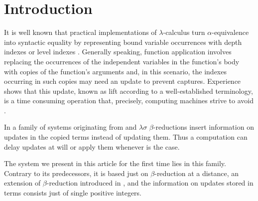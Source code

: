 \section{Introduction}

It is well known that practical implementations of $\lambda$-calculus
turn $\alpha$-equivalence into syntactic equality
by representing bound variable occurrences
with depth indexes or level indexes \cite{Bru72}.
Generally speaking, function application involves replacing the
occurrences of the independent variables in the function's body
with copies of the function's arguments
and, in this scenario, the indexes occurring in such copies
may need an update to prevent captures.
Experience shows that this update,
known as lift according to a well-established terminology,
is a time consuming operation \cite[Appendix A2]{lambdadeltaR2a}
that, precisely, computing machines strive to avoid \cite{Klu05}.

In a family of systems originating from \cite{Bru78a}
and $\lambda\sigma$ \cite{ACCL91}
$\beta$-reductions insert information on updates in the copied terms
instead of updating them.
Thus a computation can delay updates at will
or apply them whenever is the case.

The system we present in this article for the first time
lies in this family. Contrary to its predecessors,
it is based just on $\beta$-reduction at a distance,
an extension of $\beta$-reduction introduced in \cite{Ned73},
and the information on updates stored in terms
consists just of single positive integers.
